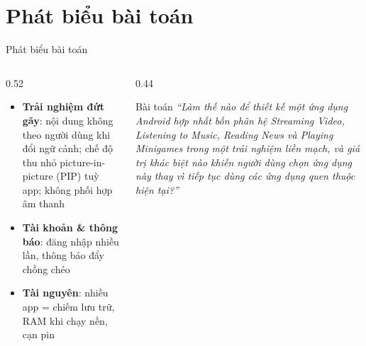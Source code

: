 \documentclass[aspectratio=169]{beamer}
\begin{document}
\section{Phát biểu bài toán}
\begin{frame}{Phát biểu bài toán}
  \begin{columns}
    \begin{column}{0.52\textwidth}
      \begin{itemize}\small
        \item \textbf{Trải nghiệm đứt gãy}: nội dung không theo người dùng khi đổi ngữ cảnh; chế độ thu nhỏ picture-in-picture (PIP) tuỳ app; không phối hợp âm thanh
        \item \textbf{Tài khoản \& thông báo}: đăng nhập nhiều lần, thông báo đẩy chồng chéo
        \item \textbf{Tài nguyên}: nhiều app = chiếm lưu trữ, RAM khi chạy nền, cạn pin
      \end{itemize}
    \end{column}
    \begin{column}{0.44\textwidth}
      \begin{alertblock}{Bài toán}
        \small\itshape ``Làm thế nào để thiết kế một ứng dụng Android hợp nhất bốn phân hệ Streaming Video, Listening to Music, Reading News và Playing Minigames trong một trải nghiệm liền mạch, và giá trị khác biệt nào khiến người dùng chọn ứng dụng này thay vì tiếp tục dùng các ứng dụng quen thuộc hiện tại?''
      \end{alertblock}
    \end{column}
  \end{columns}
\end{frame}

\end{document}
